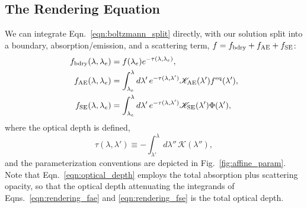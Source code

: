 \documentclass[aps,floatfix,prd,superscriptaddress,twocolumn]{revtex4-1}
\begin{document}
\subsection{The Rendering Equation}
\label{ssec:rendering_eqn}
We can integrate Eqn.~\ref{eqn:boltzmann_split} directly, 
with our solution split into a boundary, absorption/emission, and
a scattering term, $f=f_{\rm bdry}+f_{\rm AE}+f_{\rm SE}$:
\begin{align}
  \label{eqn:rendering_fbdry}
  f_{\rm bdry}(\lambda,\lambda_e)
  &= f(\lambda_e) e^{-\tau(\lambda,\lambda_e)}, \\
  \label{eqn:rendering_fae}
  f_{\rm AE}(\lambda,\lambda_e)
  &= \int_{\lambda_e}^\lambda d\lambda'\,e^{-\tau(\lambda,\lambda')}
  \mathscr{K}_{\rm AE}(\lambda')f^{\rm eq}(\lambda'), \\
  \label{eqn:rendering_fse}
  f_{\rm SE}(\lambda,\lambda_e)
  &= \int_{\lambda_e}^\lambda d\lambda'\,e^{-\tau(\lambda,\lambda')}
  \mathscr{K}_{\rm SE}(\lambda')\Phi(\lambda'),
\end{align}
where the optical depth is defined,
\begin{equation}
  \label{eqn:optical_depth}
  \tau(\lambda,\lambda') \equiv -\int_{\lambda'}^\lambda
  d\lambda'' \, \mathscr{K}(\lambda''),
\end{equation}
and the parameterization conventions are depicted in
Fig.~\ref{fig:affine_param}.
Note that Eqn.~\ref{eqn:optical_depth} employs the total absorption
plus scattering opacity, so that the optical depth attenuating the
integrands of Eqns.~\ref{eqn:rendering_fae} and \ref{eqn:rendering_fse}
is the total optical depth.

\end{document}
